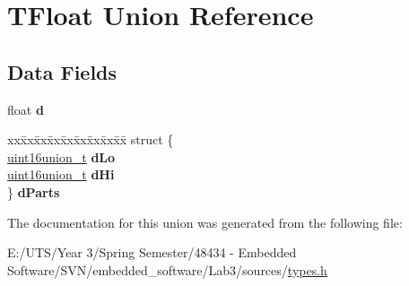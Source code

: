 \hypertarget{union_t_float}{}\section{T\+Float Union Reference}
\label{union_t_float}
\subsection*{Data Fields}
\begin{DoxyCompactItemize}
\item 
\hypertarget{union_t_float_a5261069e995f7e1b2b3b7580c954996b}{}float {\bfseries d}\label{union_t_float_a5261069e995f7e1b2b3b7580c954996b}

\item 
\hypertarget{union_t_float_ae1eaef4719ce541fef065e6ccded1a4b}{}\begin{tabbing}
xx\=xx\=xx\=xx\=xx\=xx\=xx\=xx\=xx\=\kill
struct \{\\
\>\hyperlink{unionuint16union__t}{uint16union\_t} {\bfseries dLo}\\
\>\hyperlink{unionuint16union__t}{uint16union\_t} {\bfseries dHi}\\
\} {\bfseries dParts}\label{union_t_float_ae1eaef4719ce541fef065e6ccded1a4b}
\\

\end{tabbing}\end{DoxyCompactItemize}


The documentation for this union was generated from the following file\+:\begin{DoxyCompactItemize}
\item 
E\+:/\+U\+T\+S/\+Year 3/\+Spring Semester/48434 -\/ Embedded Software/\+S\+V\+N/embedded\+\_\+software/\+Lab3/sources/\hyperlink{types_8h}{types.\+h}\end{DoxyCompactItemize}
